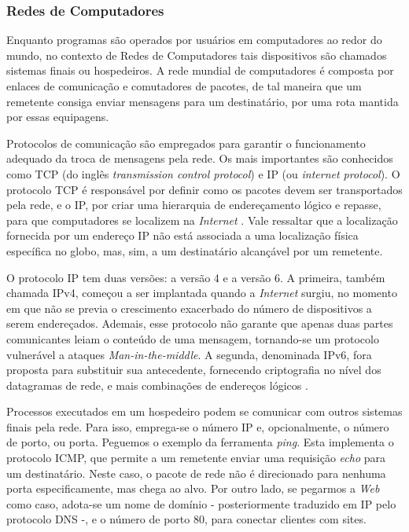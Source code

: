    \subsubsection{Redes de Computadores}
    
    \hspace{1cm}
    Enquanto programas são operados por usuários em computadores ao redor do mundo, no contexto de Redes de Computadores tais dispositivos são chamados sistemas finais ou hospedeiros. A rede mundial de computadores é composta por enlaces de comunicação e comutadores de pacotes, de tal maneira que um remetente consiga enviar mensagens para um destinatário, por uma rota mantida por essas equipagens.
    
    \vspace{4mm}
    
    \hspace{1cm}
    Protocolos de comunicação são empregados para garantir o funcionamento adequado da troca de mensagens pela rede. Os mais importantes são conhecidos como TCP (do inglês \textit{transmission control protocol}) e IP (ou \textit{internet protocol}). O protocolo TCP é responsável por definir como os pacotes devem ser transportados pela rede, e o IP, por criar uma hierarquia de endereçamento lógico e repasse, para que computadores se localizem na \textit{Internet} \cite{kurose2013}. Vale ressaltar que a localização fornecida por um endereço IP não está associada a uma localização física específica no globo, mas, sim, a um destinatário alcançável por um remetente.
    
    \vspace{4mm}
    
    \hspace{1cm}
    O protocolo IP tem duas versões: a versão 4 e a versão 6. A primeira, também chamada IPv4, começou a ser implantada quando a \textit{Internet} surgiu, no momento em que não se previa o crescimento exacerbado do número de dispositivos a serem endereçados. Ademais, esse protocolo não garante que apenas duas partes comunicantes leiam o conteúdo de uma mensagem, tornando-se um protocolo vulnerável a ataques \textit{Man-in-the-middle}. A segunda, denominada IPv6, fora proposta para substituir sua antecedente, fornecendo criptografia no nível dos datagramas de rede, e mais combinações de endereços lógicos \cite{kurose2013}.
    
    \vspace{4mm}
    
    \hspace{1cm}
    Processos executados em um hospedeiro podem se comunicar com outros sistemas finais pela rede. Para isso, emprega-se o número IP e, opcionalmente, o número de porto, ou porta. Peguemos o exemplo da ferramenta \textit{ping}. Esta implementa o protocolo ICMP, que permite a um remetente enviar uma requisição \textit{echo} para um destinatário. Neste caso, o pacote de rede não é direcionado para nenhuma porta especificamente, mas chega ao alvo. Por outro lado, se pegarmos a \textit{Web} como caso, adota-se um nome de domínio - posteriormente traduzido em IP pelo protocolo DNS -, e o número de porto 80, para conectar clientes com sites.
    
